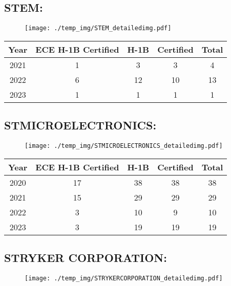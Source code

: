 \documentclass{article}%
\begin{document}
%
\newpage%
\subsection{STEM:}%
\label{subsec:STEM}%
\label{STEMdetailed}%


\begin{figure}[htbp]%
\centering%
\texttt{[image: ./temp\_img/STEM\_detailedimg.pdf]}%
\end{figure}

%
\begin{longtable}{c|c|c|c|c}%
\hline%
Year&ECE H{-}1B Certified&H{-}1B&Certified&Total\\%
\hline%
2021&1&3&3&4\\%
\hline%
2022&6&12&10&13\\%
\hline%
2023&1&1&1&1\\%
\hline%
\end{longtable}

%
\newpage%
\subsection{STMICROELECTRONICS:}%
\label{subsec:STMICROELECTRONICS}%
\label{STMICROELECTRONICSdetailed}%


\begin{figure}[htbp]%
\centering%
\texttt{[image: ./temp\_img/STMICROELECTRONICS\_detailedimg.pdf]}%
\end{figure}

%
\begin{longtable}{c|c|c|c|c}%
\hline%
Year&ECE H{-}1B Certified&H{-}1B&Certified&Total\\%
\hline%
2020&17&38&38&38\\%
\hline%
2021&15&29&29&29\\%
\hline%
2022&3&10&9&10\\%
\hline%
2023&3&19&19&19\\%
\hline%
\end{longtable}

%
\newpage%
\subsection{STRYKER CORPORATION:}%
\label{subsec:STRYKERCORPORATION}%
\label{STRYKERCORPORATIONdetailed}%


\begin{figure}[htbp]%
\centering%
\texttt{[image: ./temp\_img/STRYKERCORPORATION\_detailedimg.pdf]}%
\end{figure}
\end{document}
